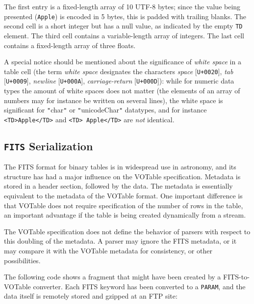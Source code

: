 \documentclass[11pt,a4paper]{ivoa}
\let\fg=\color
\def\elem#1{{\tt{\fg{DarkRed}#1}}}
\def\literalvalue#1{{\tt"}{{\fg{DarkPurple}#1}}{\tt"}}
\begin{document}
The first entry is a fixed-length array of 10 UTF-8 bytes; since
the value being presented ({\tt Apple}) is encoded in 5 bytes, this
is padded with trailing blanks. The second cell is a short integer
but has a null value, as indicated by the empty \elem{TD} element.
The third cell contains a variable-length array of integers.
The last cell contains a fixed-length array of three floats.

A special notice should be mentioned about the significance of
{\em white space} in a table cell (the term {\em white space}
designates the characters {\em space} [{\tt{U+0020}}],
{\em tab} [{\tt{U+0009}}],
{\em newline} [{\tt{U+000A}}], {\em carriage-return} [{\tt{U+000D}}]):
while for numeric data types
the amount of white spaces does not matter (the elements
of an array of numbers may for instance be written on several lines),
the white space is significant for \literalvalue{char} or
\literalvalue{unicodeChar} datatypes, and for instance
{\fg{DarkPurple}\verb+<TD>Apple</TD>+} and
{\fg{DarkPurple}\verb+<TD> Apple</TD>+} are {\em not} identical.


\subsection{\elem{FITS} Serialization}
\label{sec:FITS}
\label{elem:FITS}

The FITS format for binary tables \citep{std:FITS}
is in widespread use in astronomy,
and its structure has had a major influence on the VOTable specification.
Metadata is stored in a header section, followed by the data. The
metadata is essentially equivalent to the metadata of the VOTable
format. One important difference is that VOTable does not require
specification of the number of rows in the table, an important
advantage if the table is being created dynamically from a stream.

The VOTable specification does not define the behavior of parsers
with respect to this doubling of the metadata. A parser may ignore
the FITS metadata, or it may compare it with the VOTable metadata for
consistency, or other possibilities.

The following code shows a fragment that might have been created
by a FITS-to-VOTable converter. Each FITS keyword has been converted
to a \elem{PARAM}, and the data itself is remotely stored and gzipped at an
FTP site:
\end{document}
